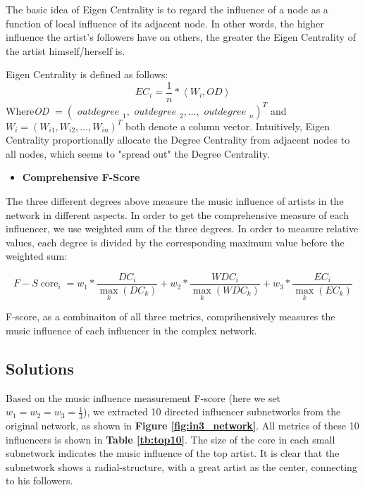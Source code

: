 \documentclass[12pt]{article}  %
\begin{document}
	The basic idea of Eigen Centrality is to regard the influence of a node as a function of local influence of its adjacent node. In other words, the higher influence the artist’s followers have on others, the greater the Eigen Centrality of the artist himself/herself is. 
	
	Eigen Centrality is defined as follows:
	\begin{equation}\label{eq:eci}
		EC_{i}=\frac{1}{n} *\left\langle W_{i}, OD\right\rangle
	\end{equation}
	Where\textit{OD} $=\left(\textit { outdegree }_{1}, \textit { outdegree }_{2}, \ldots, \textit { outdegree }_{n}\right)^{T}$ and $W_{i}=\left(W_{i 1}, W_{i 2}, \ldots, W_{i n}\right)^{T}$ both denote a column vector. Intuitively, Eigen Centrality proportionally allocate the Degree Centrality from adjacent nodes to all nodes, which seems to "spread out" the Degree Centrality.
	
	\begin{itemize}
		\item \textbf{Comprehensive F-Score} 
	\end{itemize}
	
	The three different degrees above measure the music influence of artists in the network in different aspects. In order to get the comprehensive measure of each influencer, we use weighted sum of the three degrees. In order to measure relative values, each degree is divided by the corresponding maximum value before the weighted sum:
	
	\begin{equation}
		F-S \operatorname{core}_{i}=w_{1} * \frac{D C_{i}}{\max _{k}\left(D C_{k}\right)}+w_{2} * \frac{W D C_{i}}{\max _{k}\left(W D C_{k}\right)}+w_{3} * \frac{E C_{i}}{\max _{k}\left(E C_{k}\right)}
	\end{equation}
	
	F-score, as a combinaiton of all three metrics, comprihensively measures the music influence of each influencer in the complex network.
	
	\subsection{Solutions}
	
	Based on the music influence measurement F-score (here we set $w_{1}=w_{2}=w_{3}=\frac{1}{3}$), we extracted 10 directed influencer subnetworks from the original network, as shown in \textbf{Figure \ref{fig:in3_network}}. All metrics of these 10 influencers is shown in \textbf{Table \ref{tb:top10}}. The size of the core in each small subnetwork indicates the music influence of the top artist. It is clear that the subnetwork shows a radial-structure, with a great artist as the center, connecting to his followers.
	
\end{document}
